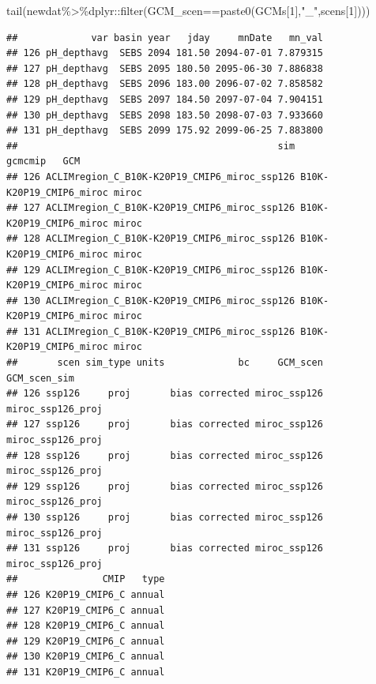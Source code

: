 \documentclass[
]{article}
\newenvironment{Shaded}{\begin{snugshade}}{\end{snugshade}}
\newcommand{\DecValTok}[1]{\textcolor[rgb]{0.00,0.00,0.81}{#1}}
\newcommand{\FunctionTok}[1]{\textcolor[rgb]{0.00,0.00,0.00}{#1}}
\newcommand{\NormalTok}[1]{#1}
\newcommand{\SpecialCharTok}[1]{\textcolor[rgb]{0.00,0.00,0.00}{#1}}
\newcommand{\StringTok}[1]{\textcolor[rgb]{0.31,0.60,0.02}{#1}}
\begin{document}
\begin{Shaded}
\begin{Highlighting}[]
\FunctionTok{tail}\NormalTok{(newdat}\SpecialCharTok{\%\textgreater{}\%}\NormalTok{dplyr}\SpecialCharTok{::}\FunctionTok{filter}\NormalTok{(GCM\_scen}\SpecialCharTok{==}\FunctionTok{paste0}\NormalTok{(GCMs[}\DecValTok{1}\NormalTok{],}\StringTok{"\_"}\NormalTok{,scens[}\DecValTok{1}\NormalTok{])))}
\end{Highlighting}
\end{Shaded}

\begin{verbatim}
##             var basin year   jday     mnDate   mn_val
## 126 pH_depthavg  SEBS 2094 181.50 2094-07-01 7.879315
## 127 pH_depthavg  SEBS 2095 180.50 2095-06-30 7.886838
## 128 pH_depthavg  SEBS 2096 183.00 2096-07-02 7.858582
## 129 pH_depthavg  SEBS 2097 184.50 2097-07-04 7.904151
## 130 pH_depthavg  SEBS 2098 183.50 2098-07-03 7.933660
## 131 pH_depthavg  SEBS 2099 175.92 2099-06-25 7.883800
##                                              sim                 gcmcmip   GCM
## 126 ACLIMregion_C_B10K-K20P19_CMIP6_miroc_ssp126 B10K-K20P19_CMIP6_miroc miroc
## 127 ACLIMregion_C_B10K-K20P19_CMIP6_miroc_ssp126 B10K-K20P19_CMIP6_miroc miroc
## 128 ACLIMregion_C_B10K-K20P19_CMIP6_miroc_ssp126 B10K-K20P19_CMIP6_miroc miroc
## 129 ACLIMregion_C_B10K-K20P19_CMIP6_miroc_ssp126 B10K-K20P19_CMIP6_miroc miroc
## 130 ACLIMregion_C_B10K-K20P19_CMIP6_miroc_ssp126 B10K-K20P19_CMIP6_miroc miroc
## 131 ACLIMregion_C_B10K-K20P19_CMIP6_miroc_ssp126 B10K-K20P19_CMIP6_miroc miroc
##       scen sim_type units             bc     GCM_scen      GCM_scen_sim
## 126 ssp126     proj       bias corrected miroc_ssp126 miroc_ssp126_proj
## 127 ssp126     proj       bias corrected miroc_ssp126 miroc_ssp126_proj
## 128 ssp126     proj       bias corrected miroc_ssp126 miroc_ssp126_proj
## 129 ssp126     proj       bias corrected miroc_ssp126 miroc_ssp126_proj
## 130 ssp126     proj       bias corrected miroc_ssp126 miroc_ssp126_proj
## 131 ssp126     proj       bias corrected miroc_ssp126 miroc_ssp126_proj
##               CMIP   type
## 126 K20P19_CMIP6_C annual
## 127 K20P19_CMIP6_C annual
## 128 K20P19_CMIP6_C annual
## 129 K20P19_CMIP6_C annual
## 130 K20P19_CMIP6_C annual
## 131 K20P19_CMIP6_C annual
\end{verbatim}
\end{document}

